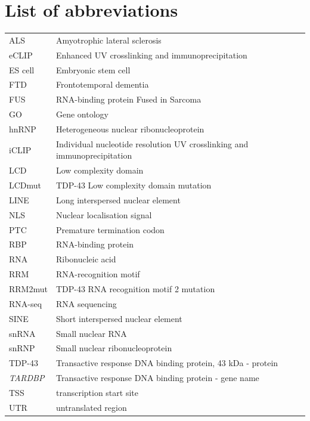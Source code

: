 \section*{\LARGE{List of abbreviations}}
\begin{table}[h!]
	\begin{tabular}{ll}
		ALS & Amyotrophic lateral sclerosis \\
		eCLIP & Enhanced UV crosslinking and immunoprecipitation \\
		ES cell & Embryonic stem cell \\
		FTD	& Frontotemporal dementia \\
		FUS & RNA-binding protein Fused in Sarcoma \\
		GO & Gene ontology \\
		hnRNP &	Heterogeneous nuclear ribonucleoprotein\\
		iCLIP & Individual nucleotide resolution UV crosslinking and immunoprecipitation \\
		LCD & Low complexity domain \\
		LCDmut & TDP-43 Low complexity domain mutation\\
		LINE & Long interspersed nuclear element \\
		NLS & Nuclear localisation signal \\
		PTC	& Premature termination codon \\
		RBP & RNA-binding protein \\
		RNA & Ribonucleic acid \\
		RRM & RNA-recognition motif \\
		RRM2mut & TDP-43 RNA recognition motif 2 mutation \\
		RNA-seq & RNA sequencing \\
		SINE & Short interspersed nuclear element \\
		snRNA & Small nuclear RNA \\
		snRNP & Small nuclear ribonucleoprotein \\
		TDP-43 & Transactive response DNA binding protein, 43 kDa - protein \\
		\textit{TARDBP} & Transactive response DNA binding protein - gene name \\
		TSS & transcription start site \\
		UTR & untranslated region \\
	\end{tabular}
\end{table}
\clearpage
